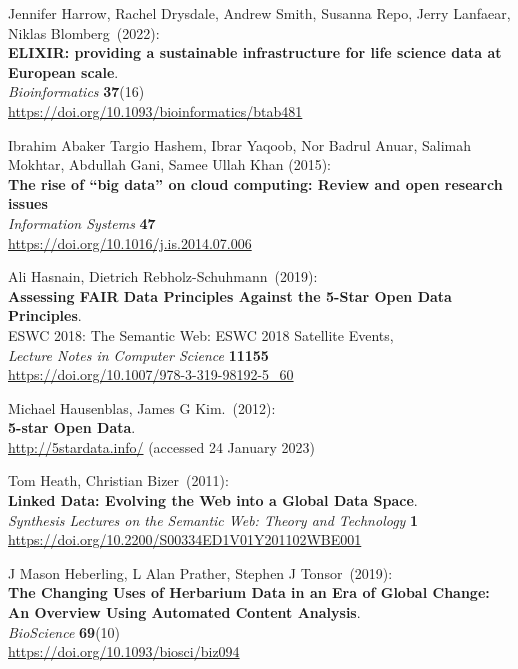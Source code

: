 \begin{thebibliography}{9}
Jennifer Harrow, Rachel Drysdale, Andrew Smith, Susanna Repo, Jerry Lanfaear, Niklas Blomberg~(2022): \\
\textbf{ELIXIR: providing a sustainable infrastructure for life science data at European scale}.\\
\emph{Bioinformatics} \textbf{37}(16)\\
\url{https://doi.org/10.1093/bioinformatics/btab481}

Ibrahim Abaker Targio Hashem, Ibrar Yaqoob, Nor Badrul Anuar, Salimah Mokhtar, Abdullah Gani, Samee Ullah Khan (2015):\\
\textbf{The rise of “big data” on cloud computing: Review and open research issues} \\
\emph{Information Systems} \textbf{47} \\
\url{https://doi.org/10.1016/j.is.2014.07.006}

Ali Hasnain, Dietrich Rebholz-Schuhmann~(2019): \\
\textbf{Assessing FAIR Data Principles Against the 5-Star Open Data Principles}.\\
ESWC 2018: The Semantic Web: ESWC 2018 Satellite Events,\\
\emph{Lecture Notes in Computer Science} \textbf{11155}\\
\url{https://doi.org/10.1007/978-3-319-98192-5_60}

Michael Hausenblas, James G Kim.~(2012): \\
\textbf{5-star {Open Data}}. \\
\url{http://5stardata.info/} (accessed 24 January 2023)

Tom Heath, Christian Bizer~(2011): \\
\textbf{Linked Data: Evolving the Web into a Global Data Space}.\\
\emph{Synthesis Lectures on the Semantic Web: Theory and Technology} \textbf{1}\\
\url{https://doi.org/10.2200/S00334ED1V01Y201102WBE001}

J Mason Heberling, L Alan Prather, Stephen J Tonsor~(2019): \\
\textbf{The Changing Uses of Herbarium Data in an Era of Global Change: An Overview Using Automated Content Analysis}.\\
\emph{BioScience} \textbf{69}(10)\\
\url{https://doi.org/10.1093/biosci/biz094}


\end{thebibliography}
